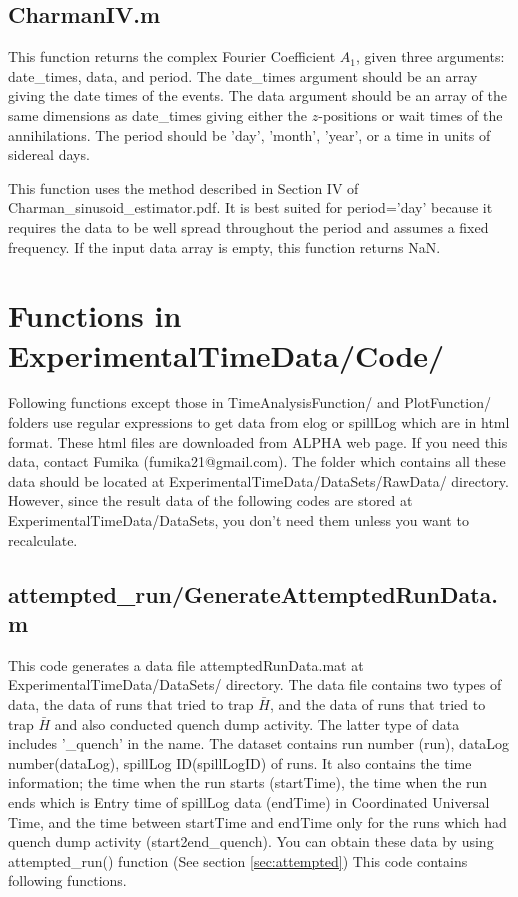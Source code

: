 \documentclass[12pt]{report}
\begin{document}
\section{CharmanIV.m}
This function returns the complex Fourier Coefficient $A_1$, given three arguments: date\_times, data, and period.  The date\_times argument should be an array giving the date times of the events.  The data argument should be an array of the same dimensions as date\_times giving either the $z$-positions or wait times of the annihilations.  The period should be 'day', 'month', 'year', or a time in units of sidereal days.

This function uses the method described in Section IV of Charman\_sinusoid\_estimator.pdf.  It  is best suited for period='day' because it requires the data to be well spread throughout the period and assumes a fixed frequency.  If the input data array is empty, this function returns NaN.


\chapter{Functions in ExperimentalTimeData/Code/}
Following functions except those in TimeAnalysisFunction/ and PlotFunction/ folders use regular expressions to get data from elog or spillLog which are in html format. These html files are downloaded from ALPHA web page. If you need this data, contact Fumika (fumika21@gmail.com). The folder which contains all these data should be located at ExperimentalTimeData/DataSets/RawData/ directory. However, since the result data of the following codes are stored at ExperimentalTimeData/DataSets, you don't need them unless you want to recalculate.

\section{attempted\_run/GenerateAttemptedRunData.m}
\label{sec:genAttempted}
This code generates a data file attemptedRunData.mat at ExperimentalTimeData/DataSets/ directory. The data file contains two types of data, the data of runs that tried to trap $\bar{H}$, and the data of runs that tried to trap $\bar{H}$ and also conducted quench dump activity. The latter type of data includes '\_quench' in the name. The dataset contains run number (run), dataLog number(dataLog), spillLog ID(spillLogID) of runs. It also contains the time information; the time when the run starts (startTime), the time when the run ends which is Entry time of  
spillLog data (endTime) in Coordinated Universal Time, and the time between startTime and endTime only for the runs which had quench dump activity (start2end\_quench). You can obtain these data by using attempted\_run() function (See section \ref{sec:attempted}) This code contains following functions.
\end{document}
